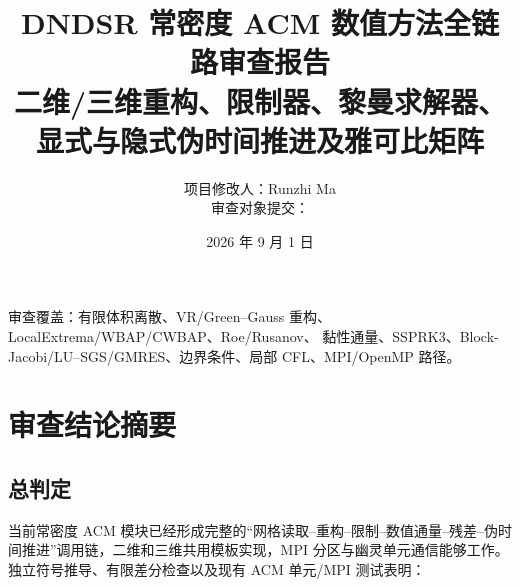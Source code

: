 \documentclass[UTF8,11pt,a4paper]{ctexart}
\title{\bfseries DNDSR 常密度 ACM 数值方法全链路审查报告\\[0.4em]
\large 二维/三维重构、限制器、黎曼求解器、显式与隐式伪时间推进及雅可比矩阵}
\author{项目修改人：Runzhi Ma\\审查对象提交：\code{043b818}}
\date{2026 年 9 月 1 日}
\begin{document}
\maketitle
\thispagestyle{empty}

\vfill
\noindent{}

\vfill
\begin{center}
\small
审查覆盖：有限体积离散、VR/Green--Gauss 重构、LocalExtrema/WBAP/CWBAP、Roe/Rusanov、\newline
黏性通量、SSPRK3、Block-Jacobi/LU--SGS/GMRES、边界条件、局部 CFL、MPI/OpenMP 路径。
\end{center}
\clearpage

\tableofcontents
\clearpage

\section{审查结论摘要}

\subsection{总判定}

当前常密度 ACM 模块已经形成完整的“网格读取--重构--限制--数值通量--残差--伪时间推进”调用链，二维和三维共用模板实现，MPI 分区与幽灵单元通信能够工作。独立符号推导、有限差分检查以及现有 ACM 单元/MPI 测试表明：
\end{document}
